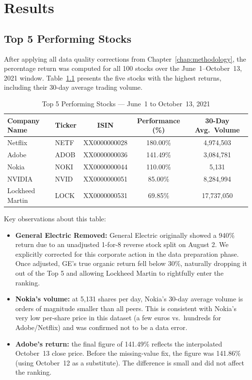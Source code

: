 \chapter{Results}
\label{chap:results}

\section{Top 5 Performing Stocks}
\label{sec:top5}

After applying all data quality corrections from Chapter~\ref{chap:methodology}, the percentage return was computed for all 100 stocks over the June~1–October~13, 2021 window. Table~\ref{tab:top5} presents the five stocks with the highest returns, including their 30-day average trading volume.

\begin{table}[H]
\centering
\caption{Top 5 Performing Stocks — June~1 to October~13, 2021}
\label{tab:top5}
\begin{tabular}{llccc}
\toprule
\textbf{Company Name} & \textbf{Ticker} & \textbf{ISIN} & \textbf{Performance (\%)} & \textbf{30-Day Avg.\ Volume} \\
\midrule
Netflix          & NETF & XX0000000028 & 180.00\% & 4{,}974{,}503 \\
Adobe            & ADOB & XX0000000036 & 141.49\% & 3{,}084{,}781 \\
Nokia            & NOKI & XX0000000044 & 110.00\% &         5{,}131 \\
NVIDIA           & NVID & XX0000000051 &  85.00\% & 8{,}284{,}994 \\
Lockheed Martin  & LOCK & XX0000000531 &  69.85\% & 17{,}737{,}050 \\
\bottomrule
\end{tabular}
\end{table}

Key observations about this table:

\begin{itemize}
    \item \textbf{General Electric Removed:} General Electric originally showed a 940\% return due to an unadjusted 1-for-8 reverse stock split on August 2. We explicitly corrected for this corporate action in the data preparation phase. Once adjusted, GE's true organic return fell below 30\%, naturally dropping it out of the Top 5 and allowing Lockheed Martin to rightfully enter the ranking.

    \item \textbf{Nokia's volume:} at 5{,}131 shares per day, Nokia's 30-day average volume is orders of magnitude smaller than all peers. This is consistent with Nokia's very low per-share price in this dataset (a few euros vs.\ hundreds for Adobe/Netflix) and was confirmed not to be a data error.

    \item \textbf{Adobe's return:} the final figure of 141.49\% reflects the interpolated October~13 close price. Before the missing-value fix, the figure was 141.86\% (using October~12 as a substitute). The difference is small and did not affect the ranking.
\end{itemize}

